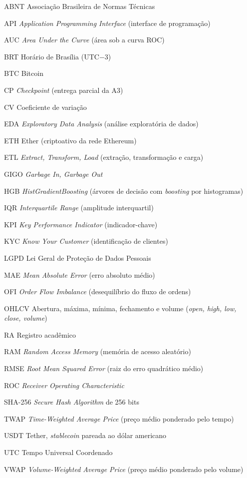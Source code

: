 \documentclass[
  12pt,
  openany,
  oneside,
  a4paper,
  chapter=TITLE,
  section=TITLE,
  english,
  brazil,
  sumario=tradicional
]{abntex2}
\newcommand{\listofquadrosname}{Lista de quadros}
\begin{document}
\pdfbookmark[0]{\listofquadrosname}{loq}
\listofquadros*
\cleardoublepage

\listoftables*
\cleardoublepage

\begin{siglas}
  \item[ABNT] Associação Brasileira de Normas Técnicas
  \item[API] \textit{Application Programming Interface} (interface de programação)
  \item[AUC] \textit{Area Under the Curve} (área sob a curva ROC)
  \item[BRT] Horário de Brasília (UTC$-3$)
  \item[BTC] Bitcoin
  \item[CP] \textit{Checkpoint} (entrega parcial da A3)
  \item[CV] Coeficiente de variação
  \item[EDA] \textit{Exploratory Data Analysis} (análise exploratória de dados)
  \item[ETH] Ether (criptoativo da rede Ethereum)
  \item[ETL] \textit{Extract, Transform, Load} (extração, transformação e carga)
  \item[GIGO] \textit{Garbage In, Garbage Out}
  \item[HGB] \textit{HistGradientBoosting} (árvores de decisão com \textit{boosting} por histogramas)
  \item[IQR] \textit{Interquartile Range} (amplitude interquartil)
  \item[KPI] \textit{Key Performance Indicator} (indicador-chave)
  \item[KYC] \textit{Know Your Customer} (identificação de clientes)
  \item[LGPD] Lei Geral de Proteção de Dados Pessoais
  \item[MAE] \textit{Mean Absolute Error} (erro absoluto médio)
  \item[OFI] \textit{Order Flow Imbalance} (desequilíbrio do fluxo de ordens)
  \item[OHLCV] Abertura, máxima, mínima, fechamento e volume (\textit{open, high, low, close, volume})
  \item[RA] Registro acadêmico
  \item[RAM] \textit{Random Access Memory} (memória de acesso aleatório)
  \item[RMSE] \textit{Root Mean Squared Error} (raiz do erro quadrático médio)
  \item[ROC] \textit{Receiver Operating Characteristic}
  \item[SHA-256] \textit{Secure Hash Algorithm} de 256 bits
  \item[TWAP] \textit{Time-Weighted Average Price} (preço médio ponderado pelo tempo)
  \item[USDT] Tether, \textit{stablecoin} pareada ao dólar americano
  \item[UTC] Tempo Universal Coordenado
  \item[VWAP] \textit{Volume-Weighted Average Price} (preço médio ponderado pelo volume)
\end{siglas}
\end{document}
